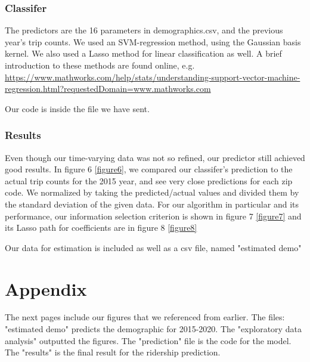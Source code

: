 \documentclass[12pt,twoside]{article}
\begin{document}
\subsubsection{Classifer}
The predictors are the 16 parameters in demographics.csv, and the previous year's trip counts. We used an SVM-regression method, using the Gaussian basis kernel. 
We also used a Lasso method for linear classification as well. 
A brief introduction to these methods are found online, e.g. \url{https://www.mathworks.com/help/stats/understanding-support-vector-machine-regression.html?requestedDomain=www.mathworks.com}



Our code is inside the file we have sent. 
\subsubsection{Results}
Even though our time-varying data was not so refined, our predictor still achieved good results. In figure 6 \ref{figure6}, we compared our classifer's prediction to the actual trip counts for the 2015 year, and see very close predictions for each zip code. We normalized by taking the predicted/actual values and divided them by the standard deviation of the given data. 
For our algorithm in particular and its performance, our information selection criterion is shown in figure 7  \ref{figure7} and its Lasso path for coefficients are in figure 8 \ref{figure8}


Our data for estimation is included as well as a csv file, named "estimated demo"
\section{Appendix} 
The next pages include our figures that we referenced from earlier. The files:
"estimated demo" predicts the demographic for 2015-2020. The "exploratory data analysis" outputted the figures. The "prediction" file is the code for the model. The "results" is the final result for the ridership prediction.
\end{document}
